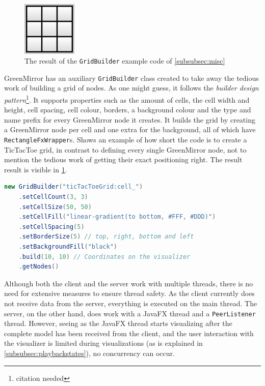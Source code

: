 \documentclass[a4paper]{article}
\begin{document}
	\begin{figure}\vspace{-22pt}
		\begin{center}
			\includegraphics[width=0.23\textwidth]{images/grid}
		\end{center}
		\vspace{-10pt}\caption{The result of the \lstinline{GridBuilder} example code of \cref{subsubsec:misc}}\vspace{-20pt}
		\label{fig:grid}
	\end{figure}
	GreenMirror has an auxiliary \lstinline{GridBuilder} class created to take away the tedious work of building a grid of nodes. As one might guess, it follows the \emph{builder design pattern}\footnote{citation needed}. It supports properties such as the amount of cells, the cell width and height, cell spacing, cell colour, borders, a background colour and the type and name prefix for every GreenMirror node it creates. It builds the grid by creating a GreenMirror node per cell and one extra for the background, all of which have \lstinline{RectangleFxWrapper}s.  Shows an example of how short the code is to create a TicTacToe grid, in contrast to defining every single GreenMirror node, not to mention the tedious work of getting their exact positioning right. The result result is visible in \cref{fig:grid}.
	\begin{lstlisting}[language=Java, label={lst:gridbuilder}, caption={Example code to build a grid of nodes}]
	new GridBuilder("ticTacToeGrid:cell_")
	.setCellCount(3, 3)
	.setCellSize(50, 50)
	.setCellFill("linear-gradient(to bottom, #FFF, #DDD)")
	.setCellSpacing(5)
	.setBorderSize(5) // top, right, bottom and left
	.setBackgroundFill("black")
	.build(10, 10) // Coordinates on the visualizer
	.getNodes()
	\end{lstlisting}
	
	Although both the client and the server work with multiple threads, there is no need for extensive measures to ensure thread safety. As the client currently does not receive data from the server, everything is executed on the main thread. The server, on the other hand, does work with a JavaFX thread and a \lstinline{PeerListener} thread. However, seeing as the JavaFX thread starts visualizing after the complete model has been received from the client, and the user interaction with the visualizer is limited during visualizations (as is explained in \cref{subsubsec:playbackstates}), no concurrency can occur.
	
\end{document}
